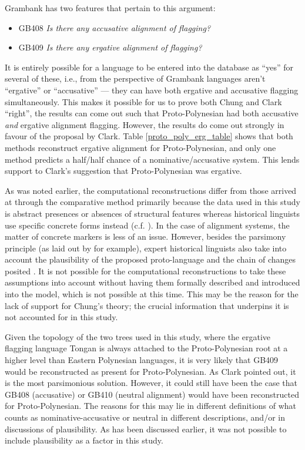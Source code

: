 \documentclass[a4paper,10pt]{article} %
\begin{document}
Grambank has two features that pertain to this argument:

\begin{itemize}
\item GB408 \emph{Is there any accusative alignment of flagging?}
\item GB409 \emph{Is there any ergative alignment of flagging?}
\end{itemize}

It is entirely possible for a language to be entered into the database as ``yes'' for several of these, i.e., from the perspective of Grambank languages aren't ``ergative'' or ``accusative'' --- they can have both ergative and accusative flagging simultaneously. This makes it possible for us to prove both Chung and Clark ``right'', the results can come out such that Proto-Polynesian had both accusative \emph{and} ergative alignment flagging. However, the results do come out strongly in favour of the proposal by Clark. Table \ref{proto_poly_erg_table} shows that both methods reconstruct ergative alignment for Proto-Polynesian, and only one method predicts a half/half chance of a nominative/accusative system. This lends support to Clark's suggestion that Proto-Polynesian was ergative.

\newcommand{\pb}[1]{\parbox[t][][t]{1\linewidth}{#1} \vspace{3.5pt}}


As was noted earlier, the computational reconstructions differ from those arrived at through the comparative method primarily because the data used in this study is abstract presences or absences of structural features whereas historical linguists use specific concrete forms instead (c.f. \citet{crowley1985common}). In the case of alignment systems, the matter of concrete markers is less of an issue. However, besides the parsimony principle (as laid out by \citet[19]{clark1976aspects} for example), expert historical linguists also take into account the plausibility of the proposed proto-language and the chain of changes posited \citep{chung1977aspects}. It is not possible for the computational reconstructions to take these assumptions into account without having them formally described and introduced into the model, which is not possible at this time. This may be the reason for the lack of support for Chung's theory; the crucial information that underpins it is not accounted for in this study.

Given the topology of the two trees used in this study, where the ergative flagging language Tongan is always attached to the Proto-Polynesian root at a higher level than Eastern Polynesian languages, it is very likely that GB409 would be reconstructed as present for Proto-Polynesian. As Clark pointed out, it is the most parsimonious solution. However, it could still have been the case that GB408 (accusative) or GB410 (neutral alignment) would have been reconstructed for Proto-Polynesian. The reasons for this may lie in different definitions of what counts as nominative-accusative or neutral in different descriptions, and/or in discussions of plausibility. As has been discussed earlier, it was not possible to include plausibility as a factor in this study.
\end{document}
